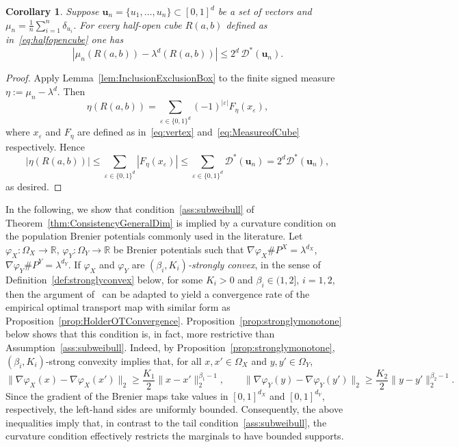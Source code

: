 \documentclass[11pt]{article}
\newtheorem{cor}[thm]{Corollary}
\newcommand{\bs}[1]{\boldsymbol{#1}}
\begin{document}
\begin{cor}
\label{cor:BoxDiscByStarDisc}
Suppose ${\bs u_n} = \{u_1, \ldots, u_n\} \subset [0, 1]^d$ be a set of vectors and $\mu_n = \frac{1}{n}\sum_{i = 1}^n \delta_{u_i}$. For every half-open cube $R(a, b)$ defined as in~\eqref{eq:halfopencube} one has
\[
|\mu_n(R(a,b))-\lambda^d(R(a,b))|\leq 2^d\, \mathcal{D}^*({\bs u_n}). 
\]
\end{cor}

\begin{proof}
Apply Lemma~\ref{lem:InclusionExclusionBox} to the finite signed measure $\eta:=\mu_n-\lambda^d$. Then
\[
\eta(R(a,b)) =\sum_{\varepsilon\in\{0,1\}^d}(-1)^{|\varepsilon|}F_\eta(x_\varepsilon),
\]
where $x_\varepsilon$ and $F_\eta$ are defined as in~\eqref{eq:vertex} and~\eqref{eq:MeasureofCube} respectively. Hence
\[
|\eta(R(a,b))| \leq \sum_{\varepsilon\in\{0,1\}^d} |F_\eta(x_\varepsilon)| \leq \sum_{\varepsilon\in\{0,1\}^d} \mathcal{D}^*({\bs u_n})=2^d \mathcal{D}^*({\bs u_n}),
\]
as desired. 
\end{proof}

In the following, we show that condition~\ref{ass:subweibull} of Theorem~\ref{thm:ConsistencyGeneralDim} is implied by a curvature condition on the population Brenier potentials commonly used in the literature.  Let $\varphi_X:\Omega_X\to\mathbb{R}$, $\varphi_Y:\Omega_Y\to\mathbb{R}$ be Brenier potentials such that $\nabla\varphi_X{\#} P^X=\lambda^{d_X}$, $\nabla\varphi_Y{\#}P^Y=\lambda^{d_Y}$. If $\varphi_X$ and $\varphi_Y$ are \textit{$(\beta_i,K_i)$-strongly convex}, in the sense of Definition~\ref{def:stronglyconvex} below, for some $K_i>0$ and $\beta_i\in(1,2]$, $i=1,2$, then the argument of~\citet[Theorem~3]{balakrishnan2025stability} can be adapted to yield a convergence rate of the empirical optimal transport map with similar form as Proposition~\ref{prop:HolderOTConvergence}. Proposition~\ref{prop:stronglymonotone} below shows that this condition is, in fact, more restrictive than Assumption~\ref{ass:subweibull}. Indeed, by Proposition~\ref{prop:stronglymonotone}, $(\beta_i,K_i)$-strong convexity implies that, for all $x,x'\in\Omega_X$ and $y,y'\in\Omega_Y$,
\[
\|\nabla\varphi_X(x)-\nabla\varphi_X(x')\|_2
\geq
\frac{K_1}{2}\|x-x'\|_2^{\beta_1-1},
\qquad
\|\nabla\varphi_Y(y) - \nabla\varphi_Y(y')\|_2
\geq
\frac{K_2}{2}\|y-y'\|_2^{\beta_2-1}.
\]
Since the gradient of the Brenier maps take values in $[0,1]^{d_X}$ and $[0,1]^{d_Y}$, respectively, the left-hand sides are uniformly bounded. Consequently, the above inequalities imply that, in contrast to the tail condition~\ref{ass:subweibull}, the curvature condition effectively restricts the marginals to have bounded supports.
\end{document}
